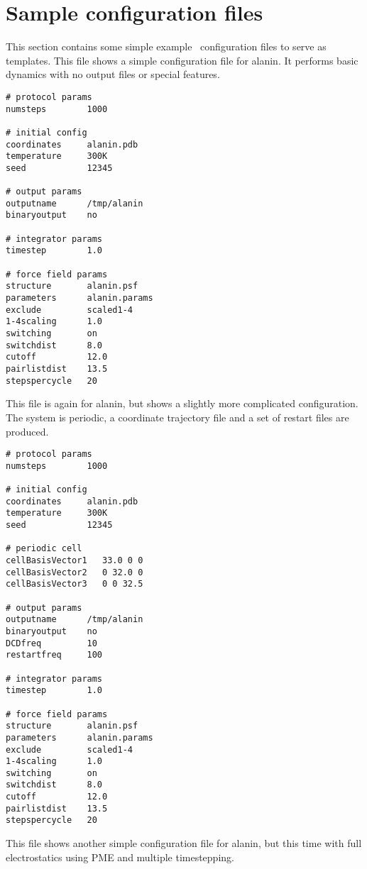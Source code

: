 \section{Sample configuration files}
\label{section:sample}
This section contains some simple example \PDAC\ configuration files to serve
as templates.
\prettypar
This file shows a simple configuration file for alanin.  
It performs basic dynamics
with no output files or special features.

\begin{verbatim}
# protocol params
numsteps        1000

# initial config
coordinates     alanin.pdb
temperature     300K
seed            12345

# output params
outputname      /tmp/alanin
binaryoutput    no

# integrator params
timestep        1.0

# force field params
structure       alanin.psf
parameters      alanin.params
exclude         scaled1-4
1-4scaling      1.0
switching       on
switchdist      8.0
cutoff          12.0
pairlistdist    13.5
stepspercycle   20
\end{verbatim}

\newpage
This file is again for alanin, 
but shows a slightly more complicated configuration.  
The system is periodic, a coordinate trajectory file
and a set of restart files are produced.

\begin{verbatim}
# protocol params
numsteps        1000

# initial config
coordinates     alanin.pdb
temperature     300K
seed            12345

# periodic cell
cellBasisVector1   33.0 0 0
cellBasisVector2   0 32.0 0
cellBasisVector3   0 0 32.5

# output params
outputname      /tmp/alanin
binaryoutput    no
DCDfreq         10
restartfreq     100

# integrator params
timestep        1.0

# force field params
structure       alanin.psf
parameters      alanin.params
exclude         scaled1-4
1-4scaling      1.0
switching       on
switchdist      8.0
cutoff          12.0
pairlistdist    13.5
stepspercycle   20
\end{verbatim}

\newpage
This file shows another simple configuration file for alanin, 
but this time with full electrostatics using PME and 
multiple timestepping.

